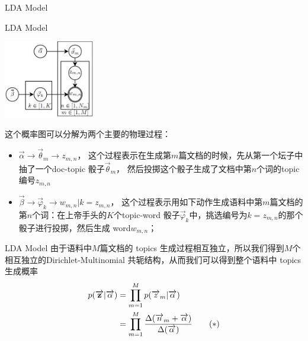 \documentclass{beamer}
\begin{document}
\begin{CJK*}{UTF8}{gbsn}
\begin{frame}{LDA Model}
\begin{small}
\end{small}
\end{frame}


\begin{frame}{LDA Model}
\begin{small}


\begin{center}
      \includegraphics[width=0.3\textwidth]{picture/w-t2.jpeg}
\end{center} 
这个概率图可以分解为两个主要的物理过程：
\begin{itemize}
\item $\overrightarrow{\alpha}\rightarrow \overrightarrow{\theta}_m \rightarrow z_{m,n}$， 这个过程表示在生成第$m$篇文档的时候，先从第一个坛子中抽了一个doc-topic 骰子$\overrightarrow{\theta}_m$， 然后投掷这个骰子生成了文档中第$n$个词的topic编号$z_{m,n}$
\item $\overrightarrow{\beta} \rightarrow \overrightarrow{\varphi}_k \rightarrow w_{m,n} | k=z_{m,n}$， 这个过程表示用如下动作生成语料中第$m$篇文档的第$n$个词：在上帝手头的$K$个topic-word 骰子$\overrightarrow{\varphi}_k$中，挑选编号为$k=z_{m,n}$的那个骰子进行投掷，然后生成 word$w_{m,n}$；
\end{itemize}
\end{small}
\end{frame}




\begin{frame}{LDA Model}
由于语料中$M$篇文档的 topics 生成过程相互独立，所以我们得到$M$个相互独立的Dirichlet-Multinomial 共轭结构，从而我们可以得到整个语料中 topics 生成概率
\begin{align*}
p(\overrightarrow{\mathbf{z}} |\overrightarrow{\alpha}) & = \prod_{m=1}^M p(\overrightarrow{z}_m |\overrightarrow{\alpha}) \notag \\
&= \prod_{m=1}^M \frac{\Delta(\overrightarrow{n}_m+\overrightarrow{\alpha})}{\Delta(\overrightarrow{\alpha})} \quad\quad (*)
\end{align*}
\end{frame}




\end{CJK*}
\end{document}
